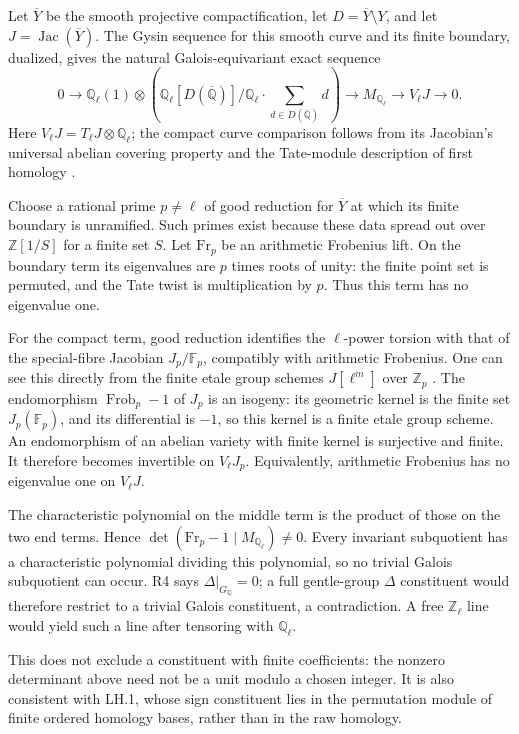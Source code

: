 Let $\overline Y$ be the smooth projective compactification,
let $D=\overline Y\setminus Y$, and let
$J=\operatorname{Jac}(\overline Y)$. The Gysin sequence
for this smooth curve and its finite boundary, dualized,
gives the natural Galois-equivariant exact sequence
\[
 0\longrightarrow
 \mathbb Q_\ell(1)\otimes
 \left(\mathbb Q_\ell[D(\overline{\mathbb Q})]
       /\mathbb Q_\ell\!\cdot\!\sum_{d\in D(\overline{\mathbb Q})}d\right)
 \longrightarrow M_{\mathbb Q_\ell}
 \longrightarrow V_\ell J\longrightarrow0.
\]
Here $V_\ell J=T_\ell J\otimes\mathbb Q_\ell$; the compact
curve comparison follows from its Jacobian's universal
abelian covering property and the Tate-module description
of first homology
\cite[Corollary~16.2]{LiftMilneLEC2013}
\cite[Proposition~9.1 and Corollary~9.6]{LiftMilneJac2021}
\cite[Theorem~15.1 and Remark~15.5]{LiftMilneAV2022}.

Choose a rational prime $p\ne\ell$ of good reduction for
$\overline Y$ at which its finite boundary is unramified.
Such primes exist because these data spread out over
$\mathbb Z[1/S]$ for a finite set $S$. Let $\mathrm{Fr}_p$
be an arithmetic Frobenius lift. On the boundary term its
eigenvalues are $p$ times roots of unity: the finite point set
is permuted, and the Tate twist is multiplication by $p$.
Thus this term has no eigenvalue one.

For the compact term, good reduction identifies the
$\ell$-power torsion with that of the special-fibre Jacobian
$J_p/\mathbb F_p$, compatibly with arithmetic Frobenius.
One can see this directly from the finite etale group schemes
$J[\ell^m]$ over $\mathbb Z_p$
\cite[Proposition~20.7]{LiftMilneAV2022}.
The endomorphism $\operatorname{Frob}_p-1$ of $J_p$ is an
isogeny: its geometric kernel is the finite set
$J_p(\mathbb F_p)$, and its differential is $-1$, so this
kernel is a finite etale group scheme. An endomorphism of an
abelian variety with finite kernel is surjective and finite.
It therefore becomes invertible on $V_\ell J_p$.
Equivalently, arithmetic Frobenius has no eigenvalue one
on $V_\ell J$.

The characteristic polynomial on the middle term is the
product of those on the two end terms. Hence
$\det(\mathrm{Fr}_p-1\mid M_{\mathbb Q_\ell})\ne0$.
Every invariant subquotient has a characteristic polynomial
dividing this polynomial, so no trivial Galois subquotient
can occur. R4 says $\Delta|_{G_{\mathbb Q}}=0$; a full
gentle-group $\Delta$ constituent would therefore restrict
to a trivial Galois constituent, a contradiction. A free
$\mathbb Z_\ell$ line would yield such a line after tensoring
with $\mathbb Q_\ell$.

This does not exclude a constituent with finite coefficients:
the nonzero determinant above need not be a unit modulo a
chosen integer. It is also consistent with LH.1, whose
sign constituent lies in the permutation module of finite
ordered homology bases, rather than in the raw homology.
